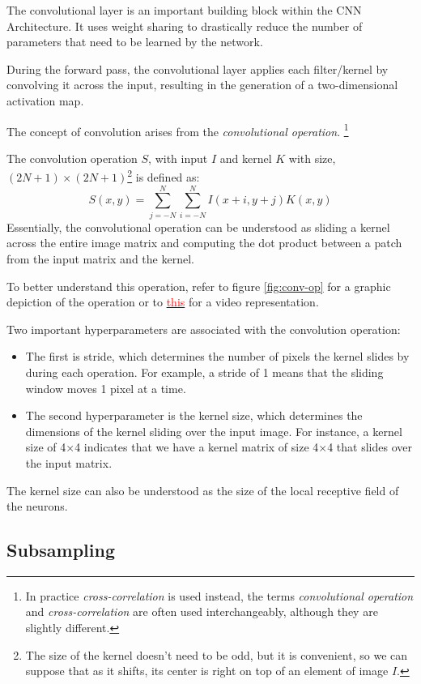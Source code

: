 The convolutional layer is an important building block within the CNN Architecture.
It uses weight sharing to drastically reduce the number of parameters that need to be learned by the network.

During the forward pass, the convolutional layer applies each filter/kernel by convolving it across the input, resulting in the generation of a two-dimensional activation map.

The concept of convolution arises from the \textit{convolutional operation}.
\footnote{In practice \textit{cross-correlation} is used instead, the terms \textit{convolutional operation} and \textit{cross-correlation} are often used interchangeably, although they are slightly different.}

The convolution operation $S$, with input $I$ and kernel $K$ with size, $(2N + 1)  \times (2N + 1)$\footnote{The size of the kernel doesn't need to be odd, but it is convenient, so we can suppose that as it shifts, its center is right on top of an element of image $I$.}
is defined as:
$$
S(x, y) = \sum_{j =-N}^{N}\sum_{i=-N}^{N} I(x+i, y+j)K(x,y)
$$
Essentially, the convolutional operation can be understood as 
sliding a kernel across the entire image matrix and computing the dot product between a patch from the input matrix and the kernel.

To better understand this operation, refer to figure \ref{fig:conv-op} for a graphic depiction of the operation or to \href{https://youtu.be/xjqCTp4xAtA}{\textcolor{red}{this}} for a video representation.

Two important hyperparameters are associated with the convolution operation:
\begin{itemize}
    \item The first is stride, which determines the number of pixels the kernel slides by during each operation. For example, a stride of 1 means that the sliding window moves 1 pixel at a time.
    \item The second hyperparameter is the kernel size, which determines the dimensions of the kernel sliding over the input image. For instance, a kernel size of 4×4 indicates that we have a kernel matrix of size 4×4 that slides over the input matrix.
\end{itemize}
The kernel size can also be understood as the size of the local receptive field of the neurons.
 
\subsection{Subsampling}

